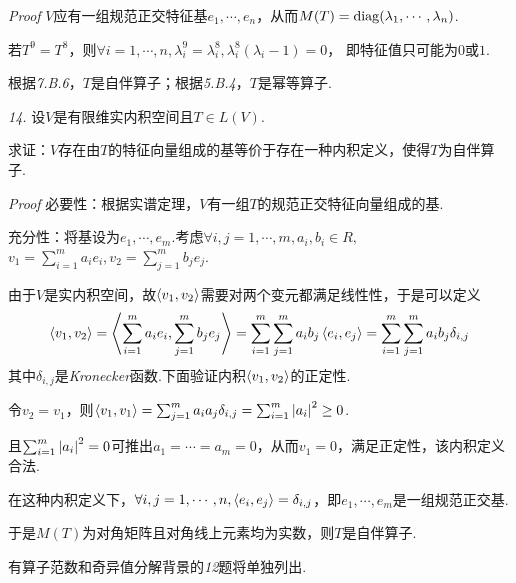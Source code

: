 \textit{Proof}
\(V\)应有一组规范正交特征基\(e_1,\cdots,e_n\)，从而\(M(T)=\mathrm{diag}(\lambda_1,\cdots,\lambda_n)\).

若\(T^9=T^8\)，则\(\forall i=1,\cdots,n,\lambda_i^9=\lambda_i^8,\lambda_i^8(\lambda_i-1)=0\)，
即特征值只可能为\(0\)或\(1\).

根据\textit{7.B.6}，\(T\)是自伴算子；根据\textit{5.B.4}，\(T\)是幂等算子.

\hspace*{\fill}

\textit{14.}
设\(V\)是有限维实内积空间且\(T \in L(V)\).

求证：\(V\)存在由\(T\)的特征向量组成的基等价于存在一种内积定义，使得\(T\)为自伴算子.

\textit{Proof}
必要性：根据实谱定理，\(V\)有一组\(T\)的规范正交特征向量组成的基.

充分性：将基设为\(e_1,\cdots,e_m\).考虑\(\forall i,j=1,\cdots,m,a_i,b_i \in R,\)
\(v_1=\sum_{i=1}^m a_ie_i,v_2=\sum_{j=1}^m b_je_j\).

由于\(V\)是实内积空间，故\(\left\langle v_1,v_2 \right\rangle\)需要对两个变元都满足线性性，于是可以定义
    \begin{align*}
        \left\langle v_1,v_2 \right\rangle=\left\langle \sum_{i=1}^m a_ie_i,\sum_{j=1}^m b_je_j \right\rangle=
        \sum_{i=1}^m \sum_{j=1}^m a_ib_j \left\langle e_i,e_j \right\rangle=\sum_{i=1}^m \sum_{j=1}^m a_ib_j\delta_{i,j}
    \end{align*}
其中\(\delta_{i,j}\)是\textit{Kronecker}函数.下面验证内积\(\left\langle v_1,v_2 \right\rangle\)的正定性.

令\(v_2=v_1\)，则\(\left\langle v_1,v_1 \right\rangle=\sum_{j=1}^m a_ia_j\delta_{i,j}=\sum_{i=1}^m \left\lvert a_i \right\rvert^2 \geq 0\).

且\(\sum_{i=1}^m \left\lvert a_i \right\rvert^2=0\)可推出\(a_1=\cdots=a_m=0\)，从而\(v_1=0\)，满足正定性，该内积定义合法.

在这种内积定义下，\(\forall i,j=1,\cdots,n,\left\langle e_i,e_j \right\rangle=\delta_{i,j}\)，即\(e_1,\cdots,e_m\)是一组规范正交基.

于是\(M(T)\)为对角矩阵且对角线上元素均为实数，则\(T\)是自伴算子.

\hspace*{\fill}

有算子范数和奇异值分解背景的\textit{12}题将单独列出.


